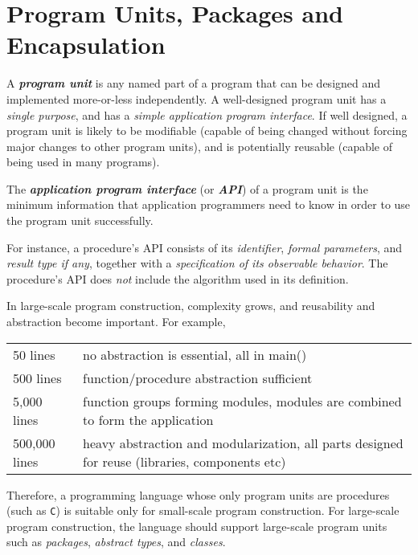 \section{Program Units, Packages and Encapsulation}
\label{sec:packages-encapsulation}

A \textit{\textbf{program unit}} is any named part of a program that can be designed and implemented more-or-less independently. A well-designed program unit has a \textit{single purpose}, and has a \textit{simple application program interface}. If well designed, a program unit is likely to be modifiable (capable of being changed without forcing major changes to other program units), and is potentially reusable (capable of being used in many programs).

The \textit{\textbf{application program interface}} (or \textit{\textbf{API}}) of a program unit is the minimum information that application programmers need to know in order to use the program unit successfully.

For instance, a procedure's API consists of its \textit{identifier}, \textit{formal parameters}, and \textit{result type if any}, together with a \textit{specification of its observable behavior}. The procedure's API does \textit{not} include the algorithm used in its definition.

In large-scale program construction, complexity grows, and reusability and abstraction become important. For example,
\begin{table}[H]
  \centering
  \begin{tabular}{lp{.6\linewidth}}
    \rowcolor{blue!10} 50 lines & no abstraction is essential, all in main() \\
    \rowcolor{blue!5} 500 lines & function/procedure abstraction sufficient\\
    \rowcolor{blue!10} 5,000 lines & function groups forming modules, modules are combined to form the application\\
    \rowcolor{blue!5} 500,000 lines & heavy abstraction and modularization, all parts designed for reuse (libraries, components etc)
\end{tabular}
\end{table}

Therefore, a programming language whose only program units are procedures (such as \texttt{C}) is suitable only for small-scale program construction. For large-scale program construction, the language should support large-scale program units such as \textit{packages}, \textit{abstract types}, and \textit{classes}.





